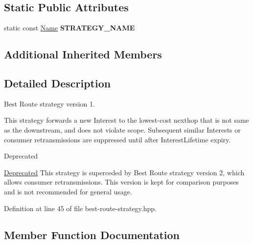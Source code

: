 \subsection*{Static Public Attributes}
\begin{DoxyCompactItemize}
\item 
static const \hyperlink{classndn_1_1Name}{Name} {\bfseries S\+T\+R\+A\+T\+E\+G\+Y\+\_\+\+N\+A\+ME}\hypertarget{classnfd_1_1fw_1_1BestRouteStrategy_a23863056222edf27836149da3ab71db7}{}\label{classnfd_1_1fw_1_1BestRouteStrategy_a23863056222edf27836149da3ab71db7}

\end{DoxyCompactItemize}
\subsection*{Additional Inherited Members}


\subsection{Detailed Description}
Best Route strategy version 1. 

This strategy forwards a new Interest to the lowest-\/cost nexthop that is not same as the downstream, and does not violate scope. Subsequent similar Interests or consumer retransmissions are suppressed until after Interest\+Lifetime expiry.

\begin{DoxyRefDesc}{Deprecated}
\item[\hyperlink{deprecated__deprecated000045}{Deprecated}]This strategy is superceded by Best Route strategy version 2, which allows consumer retransmissions. This version is kept for comparison purposes and is not recommended for general usage. \end{DoxyRefDesc}


Definition at line 45 of file best-\/route-\/strategy.\+hpp.



\subsection{Member Function Documentation}

